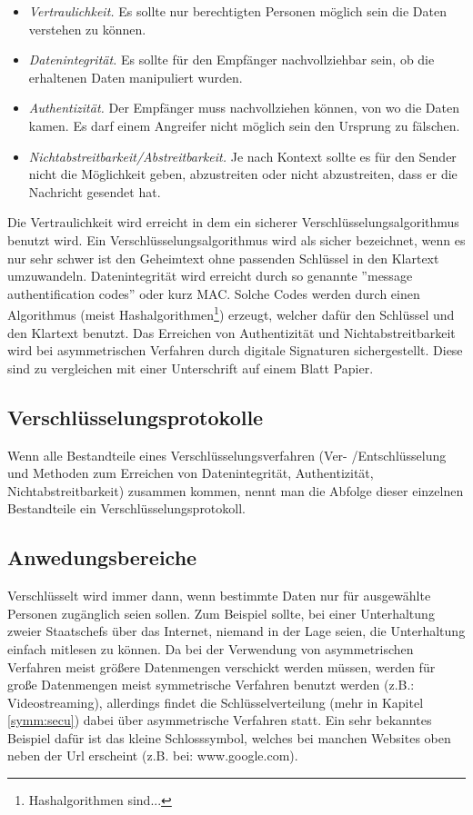 \documentclass[a4paper,12pt,titlepage]{article}
\begin{document}
\begin{itemize}
\item \textit{Vertraulichkeit.} Es sollte nur berechtigten Personen möglich sein die Daten verstehen zu können.

\item \textit{Datenintegrität.} Es sollte für den Empfänger nachvollziehbar sein, ob die erhaltenen Daten manipuliert wurden.

\item \textit{Authentizität.} Der Empfänger muss nachvollziehen können, von wo die Daten kamen. Es darf einem Angreifer nicht möglich sein den Ursprung zu fälschen.

\item \textit{Nichtabstreitbarkeit/Abstreitbarkeit.} Je nach Kontext sollte es für den Sender nicht die Möglichkeit geben, abzustreiten oder nicht abzustreiten, dass er die Nachricht gesendet hat.
\end{itemize} %
Die Vertraulichkeit wird erreicht in dem ein sicherer Verschlüsselungsalgorithmus benutzt wird. Ein Verschlüsselungsalgorithmus wird als sicher bezeichnet, wenn es nur sehr schwer ist den Geheimtext ohne passenden Schlüssel in den Klartext umzuwandeln. Datenintegrität wird erreicht durch so genannte ''message authentification codes'' oder kurz MAC. Solche Codes werden durch einen Algorithmus (meist Hashalgorithmen\footnote{Hashalgorithmen sind...}) erzeugt, welcher dafür den Schlüssel und den Klartext benutzt. Das Erreichen von Authentizität und Nichtabstreitbarkeit wird bei asymmetrischen Verfahren durch digitale Signaturen sichergestellt. Diese sind zu vergleichen mit einer Unterschrift auf einem Blatt Papier.

\subsection{Verschlüsselungsprotokolle}
Wenn alle Bestandteile eines Verschlüsselungsverfahren (Ver- /Entschlüsselung und Methoden zum Erreichen von Datenintegrität, Authentizität, Nichtabstreitbarkeit) zusammen kommen, nennt man die Abfolge dieser einzelnen Bestandteile ein Verschlüsselungsprotokoll.

\subsection{Anwedungsbereiche}
Verschlüsselt wird immer dann, wenn bestimmte Daten nur für ausgewählte Personen zugänglich seien sollen. Zum Beispiel sollte, bei einer Unterhaltung zweier Staatschefs über das Internet, niemand in der Lage seien, die Unterhaltung einfach mitlesen zu können. Da bei der Verwendung von asymmetrischen Verfahren meist größere Datenmengen verschickt werden müssen, werden für große Datenmengen meist symmetrische Verfahren benutzt werden (z.B.: Videostreaming), allerdings findet die Schlüsselverteilung (mehr in Kapitel \ref{symm:secu}) dabei über asymmetrische Verfahren statt. Ein sehr bekanntes Beispiel dafür ist das kleine Schlosssymbol, welches bei manchen Websites oben neben der Url erscheint (z.B. bei: www.google.com).
\newpage
\end{document}
